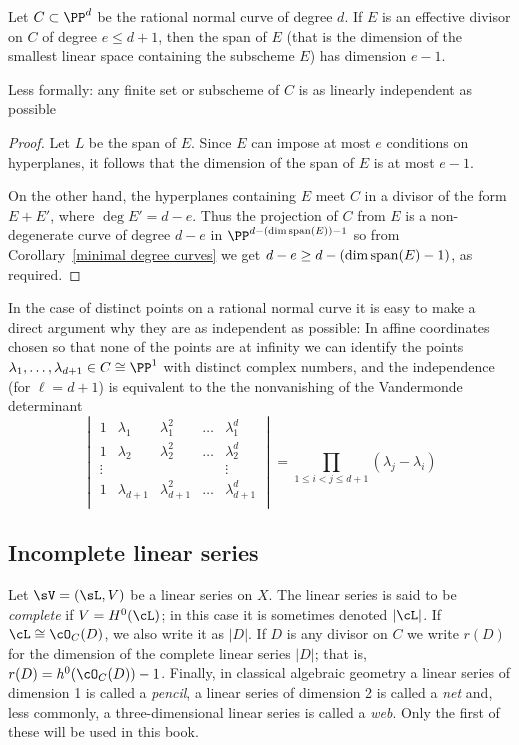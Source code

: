 \begin{corollary}\label{independence of points on a RNC}
Let $C\subset \PP^d$ be the rational normal curve of degree $d$. If $E$ is an effective divisor on $C$ of degree $e\leq d+1$, then the
span of $E$ (that is the dimension of the smallest linear space containing the subscheme $E$) has dimension $e-1$.
\end{corollary}
Less formally: any finite set or subscheme of $C$ is as linearly independent as possible

\begin{proof}
Let $L$ be the span of $E$. Since $E$ can impose at most $e$ conditions on hyperplanes, it follows that the dimension of the span of $E$ is
at most $e-1$.

On the other hand, the hyperplanes containing $E$ meet $C$ in a divisor of the form $E+E'$, where
$\deg E' = d-e$. Thus the projection of $C$ from $E$ is a non-degenerate curve of degree $d-e$ in $\PP^{d-(\dim {\rm span}(E))-1}$
so from Corollary~\ref{minimal degree curves} we get $d-e \geq d-(\dim {\rm span}(E)-1)$, as required.
\end{proof}

In the case of distinct points on a rational normal curve
it is easy to make a direct argument why they are as independent as possible: In affine coordinates chosen so that none of the points are
at infinity we can identify the points $\lambda_1,\dots,\lambda_{d+1} \in C \cong \PP^1$ with distinct complex numbers, and the independence (for $\ell = d+1$) is equivalent to the the nonvanishing of the Vandermonde determinant
$$
\begin{vmatrix}
1 & \lambda_1 & \lambda_1^2 & \dots & \lambda_1^d \\
1 & \lambda_2 & \lambda_2^2 & \dots & \lambda_2^d \\
\vdots & & & & \vdots \\
1 & \lambda_{d+1} & \lambda_{d+1}^2 & \dots & \lambda_{d+1}^d \\
\end{vmatrix}
= \prod_{1 \leq i < j \leq d+1} (\lambda_j - \lambda_i)
$$


\subsection{Incomplete linear series}


Let $\sV = (\sL, V)$ be a linear series on $X$.  The linear series is said to be \emph{complete} if $V = H^0(\cL)$; in this case it is sometimes denoted $|\cL|$. If $\cL \cong \cO_C(D)$, we also write it as $|D|$. 
 If $D$ is any divisor on $C$ we write $r(D)$ for the dimension of the complete linear series $|D|$; that is, $r(D) = h^0(\cO_C(D)) - 1$. Finally, in classical algebraic geometry a linear series of dimension 1 is called a \emph{pencil}, a linear series of dimension 2 is called a \emph{net} and, less commonly, a three-dimensional linear series is called a \emph{web}.  Only the first of these will be
 used in this book.

